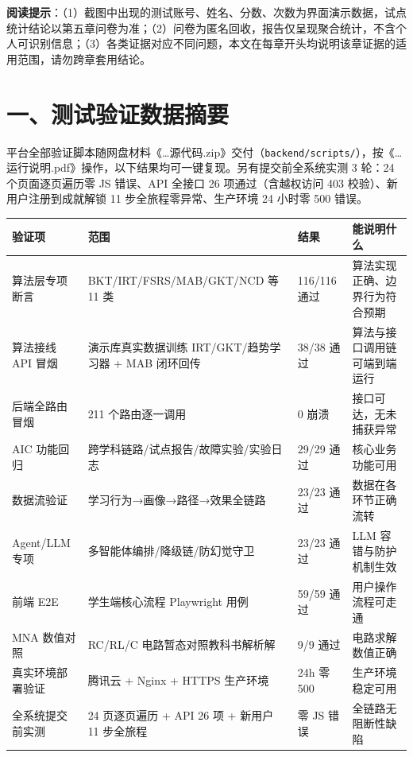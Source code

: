 \documentclass[zihao=-4,a4paper,UTF8,fontset=windows]{ctexart}
\begin{document}
\textbf{阅读提示}：（1）截图中出现的测试账号、姓名、分数、次数为界面演示数据，试点统计结论以第五章问卷为准；（2）问卷为匿名回收，报告仅呈现聚合统计，不含个人可识别信息；（3）各类证据对应不同问题，本文在每章开头均说明该章证据的适用范围，请勿跨章套用结论。

\section{一、测试验证数据摘要}

平台全部验证脚本随网盘材料《\dots{}源代码.zip》交付（\texttt{backend/scripts/}），按《\dots{}运行说明.pdf》操作，以下结果均可一键复现。另有提交前全系统实测 3 轮：24 个页面逐页遍历零 JS 错误、API 全接口 26 项通过（含越权访问 403 校验）、新用户注册到成就解锁 11 步全旅程零异常、生产环境 24 小时零 500 错误。

{\setlength{\tabcolsep}{3pt}
\par\noindent\begin{tabular}{|p{2.2cm}|p{4.6cm}|p{2.0cm}|p{4.8cm}|}
\hline
\textbf{验证项} & \textbf{范围} & \textbf{结果} & \textbf{能说明什么} \\ \hline
算法层专项断言 & BKT/IRT/FSRS/MAB/GKT/NCD 等 11 类 & 116/116 通过 & 算法实现正确、边界行为符合预期 \\ \hline
算法接线 API 冒烟 & 演示库真实数据训练 IRT/GKT/趋势学习器 + MAB 闭环回传 & 38/38 通过 & 算法与接口调用链可端到端运行 \\ \hline
后端全路由冒烟 & 211 个路由逐一调用 & 0 崩溃 & 接口可达，无未捕获异常 \\ \hline
AIC 功能回归 & 跨学科链路/试点报告/故障实验/实验日志 & 29/29 通过 & 核心业务功能可用 \\ \hline
数据流验证 & 学习行为→画像→路径→效果全链路 & 23/23 通过 & 数据在各环节正确流转 \\ \hline
Agent/LLM 专项 & 多智能体编排/降级链/防幻觉守卫 & 23/23 通过 & LLM 容错与防护机制生效 \\ \hline
前端 E2E & 学生端核心流程 Playwright 用例 & 59/59 通过 & 用户操作流程可走通 \\ \hline
MNA 数值对照 & RC/RL/C 电路暂态对照教科书解析解 & 9/9 通过 & 电路求解数值正确 \\ \hline
真实环境部署验证 & 腾讯云 + Nginx + HTTPS 生产环境 & 24h 零 500 & 生产环境稳定可用 \\ \hline
全系统提交前实测 & 24 页逐页遍历 + API 26 项 + 新用户 11 步全旅程 & 零 JS 错误 & 全链路无阻断性缺陷 \\ \hline
\end{tabular}\par}
\end{document}
